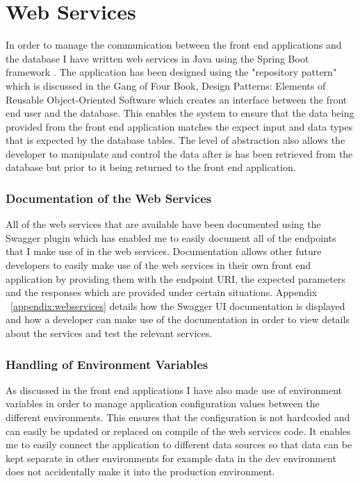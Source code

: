 \documentclass[a4paper,11pt]{report}
\begin{document}
\section{Web Services}
In order to manage the communication between the front end applications and the database I have written web services in Java using the Spring Boot framework \cite{spring}. 
The application has been designed using the "repository pattern" which is discussed in the Gang of Four Book, Design Patterns: Elements of Reusable Object-Oriented Software\cite{gamma1994design} which creates an interface between the front end user and the database. This enables the system to ensure that the data being provided from the front end application matches the expect input and data types that is expected by the database tables. The level of abstraction also allows the developer to manipulate and control the data after is has been retrieved from the database but prior to it being returned to the front end application.

\subsubsection{Documentation of the Web Services}
All of the web services that are available have been documented using the Swagger\cite{swagger} plugin which has enabled me to easily document all of the endpoints that I make use of in the web services. Documentation allows other future developers to easily make use of the web services in their own front end application by providing them with the endpoint URI, the expected parameters and the responses which are provided under certain situations. Appendix ~\ref{appendix:webservices} details how the Swagger UI documentation is displayed and how a developer can make use of the documentation in order to view details about the services and test the relevant services.

\subsubsection{Handling of Environment Variables}
As discussed in the front end applications I have also made use of environment variables in order to manage application configuration values between the different environments. This ensures that the configuration is not hardcoded and can easily be updated or replaced on compile of the web services code. It enables me to easily connect the application to different data sources so that data can be kept separate in other environments for example data in the dev environment does not accidentally make it into the production environment. 
\end{document}
